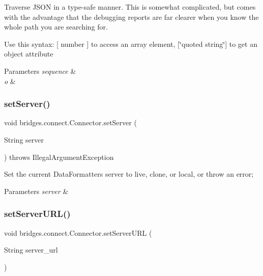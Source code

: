 Traverse J\+S\+ON in a type-\/safe manner. This is somewhat complicated, but comes with the advantage that the debugging reports are far clearer when you know the whole path you are searching for.

Use this syntax\+: \mbox{[} number \mbox{]} to access an array element, \mbox{[}\char`\"{}quoted string\char`\"{}\mbox{]} to get an object attribute


\begin{DoxyParams}{Parameters}
{\em sequence} & \\
\hline
{\em o} & \\
\hline
\end{DoxyParams}
\mbox{\label{classbridges_1_1connect_1_1_connector_acab24a8c4ffd3349ec67536552fb30b3}} 
\subsubsection{\texorpdfstring{set\+Server()}{setServer()}}
{\footnotesize\ttfamily void bridges.\+connect.\+Connector.\+set\+Server (\begin{DoxyParamCaption}\item[{String}]{server }\end{DoxyParamCaption}) throws Illegal\+Argument\+Exception}

Set the current Data\+Formatters server to live, clone, or local, or throw an error; 
\begin{DoxyParams}{Parameters}
{\em server} & \\
\hline
\end{DoxyParams}
\mbox{\label{classbridges_1_1connect_1_1_connector_a71f449c91e529f79730df27e01fdf674}} 
\subsubsection{\texorpdfstring{set\+Server\+U\+R\+L()}{setServerURL()}}
{\footnotesize\ttfamily void bridges.\+connect.\+Connector.\+set\+Server\+U\+RL (\begin{DoxyParamCaption}\item[{String}]{server\+\_\+url }\end{DoxyParamCaption})}

